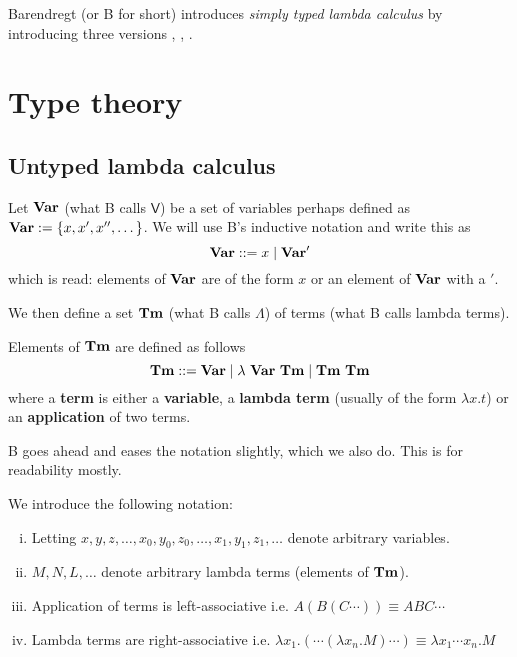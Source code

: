 
Barendregt \cite{BarendregtHenk2013Lcwt} (or B for short) introduces {\it simply typed lambda calculus} by introducing three versions \stcu, \stch, \stdb.

\section{Type theory}

\subsection{Untyped lambda calculus}

\begin{defin}

    Let $\mathbf{Var}$ (what B calls $\mathsf{V}$) be a set of variables perhaps defined as $\mathbf{Var} := \{x, x', x'', \dots\}$. We will use B's inductive notation and write this as $$\mathbf{Var}::= x \mid \mathbf{Var} '$$
    which is read: elements of $\mathbf{Var}$ are of the form $x$ or an element of $\mathbf{Var}$ with a $'$.

\end{defin}

We then define a set $\mathbf{Tm}$ (what B calls $\Lambda$) of terms (what B calls lambda terms). 

\begin{defin}

    Elements of $\mathbf{Tm}$ are defined as follows $$\Tm ::= \Var \mid \lambda\ \Var\ \Tm \mid \Tm\ \Tm$$
    where a {\bf term} is either a {\bf variable}, a {\bf lambda term} (usually of the form $\lambda x.t$) or an {\bf application} of two terms.

\end{defin}

B goes ahead and eases the notation slightly, which we also do. This is for readability mostly.


\begin{remark}
   
    We introduce the following notation:

    \begin{enumerate}[(i)]
        \item Letting $x,y,z, \dots, x_0,y_0,z_0, \dots, x_1,y_1,z_1,\dots$ denote arbitrary variables.
        \item $M,N,L,\dots$ denote arbitrary lambda terms (elements of $\mathbf{Tm}$).
        \item Application of terms is left-associative i.e. $A(B(C\cdots)) \equiv ABC\cdots$
        \item Lambda terms are right-associative i.e. $\lambda x_1.(\cdots (\lambda x_n.M) \cdots ) \equiv \lambda x_1 \cdots x_n.M$
    \end{enumerate}

\end{remark}

